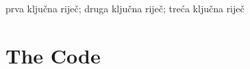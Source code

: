 \documentclass[masterthesis]{fer}
\begin{document}
\begin{kljucnerijeci}
  prva ključna riječ; druga ključna riječ; treća ključna riječ
\end{kljucnerijeci}




\backmatter

\chapter{The Code}
\end{document}
